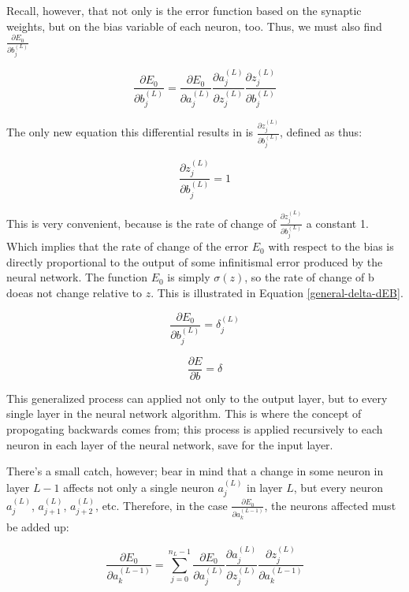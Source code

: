\documentclass[12pt]{article}
\begin{document}
        Recall, however, that not only is the error function based on the synaptic weights, but on the bias variable of each neuron, too. Thus, we must also find $\frac{\partial E_0}{\partial b_j^{(L)}}$

        \[ \frac{\partial E_0}{\partial b_j^{(L)}} = \frac{\partial E_0}{\partial a_j^{(L)}}  \frac{\partial a_j^{(L)}}{\partial z_j^{(L)}} \frac{\partial z_j^{(L)}}{\partial b_j^{(L)}}\]

        The only new equation this differential results in is $\frac{\partial z_j^{(L)}}{\partial b_j^{(L)}}$, defined as thus:

        \[\frac{\partial z_j^{(L)}}{\partial b_j^{(L)}} = 1 \]

        This is very convenient, because is the rate of change of $\frac{\partial z_j^{(L)}}{\partial b_j^{(L)}}$ a constant 1. Which implies that the rate of change of the error $E_0$ with respect to the bias is directly proportional to the output of some infinitismal error produced by the neural network. The function $E_0$ is simply $\sigma(z)$, so the rate of change of b doeas not change relative to $z$. This is illustrated in Equation \ref{general-delta-dEB}.

        \[ \frac{\partial E_0}{\partial b_j^{(L)}} = \delta_j^{(L)}\]
        
        \begin{equation} \label{general-delta-dEB}
             \frac{\partial E}{\partial b} = \delta 
        \end{equation}


        This generalized process can applied not only to the output layer, but to every single layer in the neural network algorithm. This is where the concept of propogating backwards comes from; this process is applied recursively to each neuron in each layer of the neural network, save for the input layer.

        There's a small catch, however; bear in mind that a change in some neuron in layer $L-1$ affects not only a single neuron $a_j^{(L)}$ in layer $L$, but every neuron $a_j^{(L)}$, $a_{j+1}^{(L)}$, $a_{j+2}^{(L)}$, etc. Therefore, in the case $ \frac{\partial E_0}{\partial a_k^{(L-1)}} $, the neurons affected must be added up:

        \[ \frac{\partial E_0}{\partial a_k^{(L-1)}} = \sum_{j=0}^{n_L-1} \frac{\partial E_0}{\partial a_j^{(L)}}  \frac{\partial a_j^{(L)}}{\partial z_j^{(L)}} \frac{\partial z_j^{(L)}}{\partial a_k^{(L-1)}} \]
\end{document}
